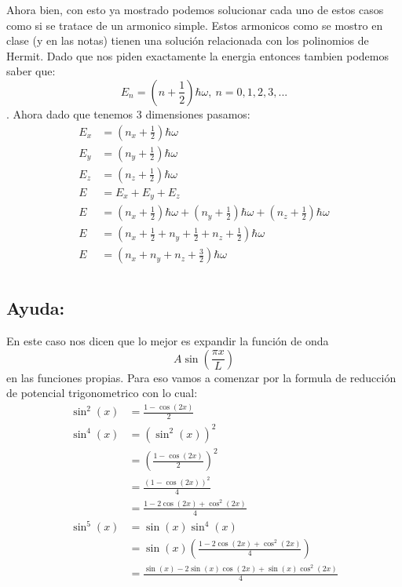 \documentclass{report}
\begin{document}
Ahora bien, con esto ya mostrado podemos solucionar cada uno de estos casos como si se tratace de un armonico simple. Estos armonicos como se mostro en clase (y en las notas) tienen una solución relacionada con los polinomios de Hermit. Dado que nos piden exactamente la energia entonces tambien podemos saber que: \[E_n = \left(n + \frac{1}{2}\right)\hbar\omega,\ n=0,1,2,3,...\]. Ahora dado que tenemos $3$ dimensiones pasamos:
\begin{align*}
  E_x &= \left(n_x + \frac{1}{2}\right)\hbar\omega\\
  E_y &= \left(n_y + \frac{1}{2}\right)\hbar\omega\\
  E_z &= \left(n_z + \frac{1}{2}\right)\hbar\omega\\
  E &= E_x + E_y + E_z\\
  E &= \left(n_x + \frac{1}{2}\right)\hbar\omega + \left(n_y + \frac{1}{2}\right)\hbar\omega + \left(n_z + \frac{1}{2}\right)\hbar\omega\\
  E &= \left(n_x + \frac{1}{2} + n_y + \frac{1}{2} + n_z + \frac{1}{2} \right)\hbar\omega\\
  E &= \left(n_x + n_y + n_z + \frac{3}{2} \right)\hbar\omega
\end{align*}

\chapter{}

\chapter{}

\section*{Ayuda:}

En este caso nos dicen que lo mejor es expandir la función de onda \[A\sin\left(\frac{\pi x}{L}\right)\] en las funciones propias. Para eso vamos a comenzar por la formula de reducción de potencial trigonometrico con lo cual:
\begin{align*}
  \sin^2(x) &= \frac{1 - \cos(2x)}{2}\\
  \sin^4(x) &= \left(\sin^2(x)\right)^2\\
  &= \left(\frac{1 - \cos(2x)}{2}\right)^2\\
  &= \frac{\left( 1 - \cos(2x)\right)^2}{4}\\
  &= \frac{1 - 2\cos(2x) + \cos^2(2x)}{4}\\
  \sin^5(x) &= \sin(x)\sin^4(x) \\
  &= \sin(x)\left(\frac{1 - 2\cos(2x) + \cos^2(2x)}{4}\right)\\
  &= \frac{\sin(x) - 2\sin(x)\cos(2x) + \sin(x)\cos^2(2x)}{4}\\
\end{align*}
\end{document}
